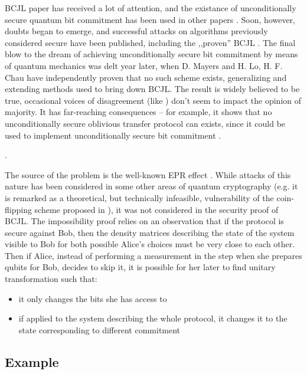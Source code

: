 \documentclass[10pt]{article}
\begin{document}
BCJL paper has received a lot of attention, and the existance of unconditionally secure quantum bit
commitment has been used in other papers \cite{Yao95}. Soon, however, doubts began to emerge, and
successful attacks on algorithms previously considered secure have been published, including the
,,proven'' BCJL \cite{Lo96,Mayers96}\footnotemark. The final blow to the dream of achieving unconditionally
secure bit commitment by means of quantum mechanics was delt year later, when D. Mayers \cite{Mayers97}
and H. Lo, H. F. Chau \cite{Lo98} have independently proven that no such scheme exists, generalizing
and extending methods used to bring down BCJL. The result is widely believed to be true, occasional
voices of disagreement (like \cite{Yuen01}) don't seem to impact the opinion of majority. It has
far-reaching consequences -- for example, it shows that no unconditionally secure oblivious transfer
protocol can exists, since it could be used to implement unconditionally secure bit commitment
\cite{Crepeau88}.

. 

The source of the problem is the well-known EPR effect \cite{EPR}. While  attacks of this nature has
been considered in some other areas of quantum cryptography (e.g. it is remarked as a theoretical,
but technically infeasible, vulnerability of the coin-flipping scheme proposed in \cite{bb84}),
it was not considered in the security proof of BCJL. The impossibility proof relies on an observation
that if the protocol is secure against Bob, then the density matrices describing the state of the
system visible to Bob for both possible Alice's choices must be very close to each other. Then if 
Alice, instead of performing a measurement in the step when she prepares qubits for Bob, decides to
skip it, it is possible for her later to find unitary transformation such that:
\begin{itemize}
  \item it only changes the bits she has access to
  \item if applied to the system describing the whole protocol, it changes it to the state 
    corresponding to different commitment
\end{itemize}

\subsection*{Example}
\end{document}
